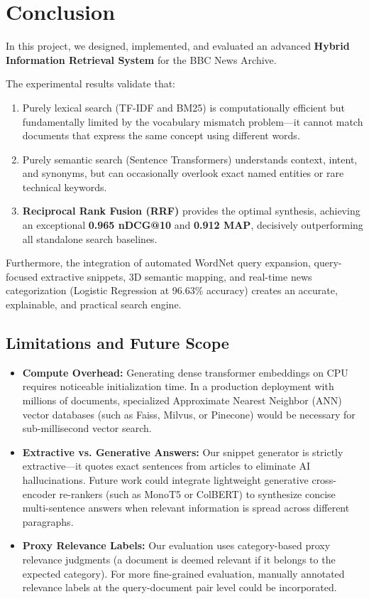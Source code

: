 \documentclass[11pt,a4paper]{article}
\begin{document}
\section{Conclusion}

In this project, we designed, implemented, and evaluated an advanced \textbf{Hybrid Information Retrieval System} for the BBC News Archive.

The experimental results validate that:
\begin{enumerate}[leftmargin=1.5em]
    \item Purely lexical search (TF-IDF and BM25) is computationally efficient but fundamentally limited by the vocabulary mismatch problem---it cannot match documents that express the same concept using different words.
    \item Purely semantic search (Sentence Transformers) understands context, intent, and synonyms, but can occasionally overlook exact named entities or rare technical keywords.
    \item \textbf{Reciprocal Rank Fusion (RRF)} provides the optimal synthesis, achieving an exceptional \textbf{0.965 nDCG@10} and \textbf{0.912 MAP}, decisively outperforming all standalone search baselines.
\end{enumerate}

Furthermore, the integration of automated WordNet query expansion, query-focused extractive snippets, 3D semantic mapping, and real-time news categorization (Logistic Regression at 96.63\% accuracy) creates an accurate, explainable, and practical search engine.

\subsection{Limitations and Future Scope}
\begin{itemize}[leftmargin=1.5em]
    \item \textbf{Compute Overhead:} Generating dense transformer embeddings on CPU requires noticeable initialization time. In a production deployment with millions of documents, specialized Approximate Nearest Neighbor (ANN) vector databases (such as Faiss, Milvus, or Pinecone) would be necessary for sub-millisecond vector search.
    \item \textbf{Extractive vs. Generative Answers:} Our snippet generator is strictly extractive---it quotes exact sentences from articles to eliminate AI hallucinations. Future work could integrate lightweight generative cross-encoder re-rankers (such as MonoT5 or ColBERT) to synthesize concise multi-sentence answers when relevant information is spread across different paragraphs.
    \item \textbf{Proxy Relevance Labels:} Our evaluation uses category-based proxy relevance judgments (a document is deemed relevant if it belongs to the expected category). For more fine-grained evaluation, manually annotated relevance labels at the query-document pair level could be incorporated.
\end{itemize}
\end{document}
